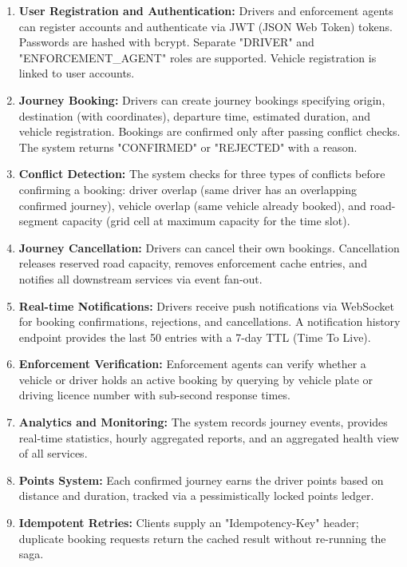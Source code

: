 \documentclass[11pt,a4paper]{article}
\begin{document}
\begin{enumerate}[label=\textbf{FR\arabic*}]
    \item \textbf{User Registration and Authentication:} Drivers and enforcement agents can register accounts and authenticate via JWT (JSON Web Token) tokens. Passwords are hashed with bcrypt. Separate "DRIVER" and "ENFORCEMENT\_AGENT" roles are supported. Vehicle registration is linked to user accounts.
    \item \textbf{Journey Booking:} Drivers can create journey bookings specifying origin, destination (with coordinates), departure time, estimated duration, and vehicle registration. Bookings are confirmed only after passing conflict checks. The system returns "CONFIRMED" or "REJECTED" with a reason.
    \item \textbf{Conflict Detection:} The system checks for three types of conflicts before confirming a booking: driver overlap (same driver has an overlapping confirmed journey), vehicle overlap (same vehicle already booked), and road-segment capacity (grid cell at maximum capacity for the time slot).
    \item \textbf{Journey Cancellation:} Drivers can cancel their own bookings. Cancellation releases reserved road capacity, removes enforcement cache entries, and notifies all downstream services via event fan-out.
    \item \textbf{Real-time Notifications:} Drivers receive push notifications via WebSocket for booking confirmations, rejections, and cancellations. A notification history endpoint provides the last 50 entries with a 7-day TTL (Time To Live).
    \item \textbf{Enforcement Verification:} Enforcement agents can verify whether a vehicle or driver holds an active booking by querying by vehicle plate or driving licence number with sub-second response times.
    \item \textbf{Analytics and Monitoring:} The system records journey events, provides real-time statistics, hourly aggregated reports, and an aggregated health view of all services.
    \item \textbf{Points System:} Each confirmed journey earns the driver points based on distance and duration, tracked via a pessimistically locked points ledger.
    \item \textbf{Idempotent Retries:} Clients supply an "Idempotency-Key" header; duplicate booking requests return the cached result without re-running the saga.
\end{enumerate}
 
\end{document}
